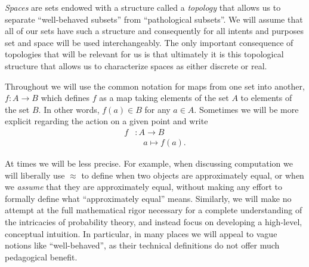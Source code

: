 \emph{Spaces} are sets endowed with a structure called a 
\emph{topology} that allows us to separate ``well-behaved subsets''
from ``pathological subsets''.  We will assume that all of our sets
have such a structure and consequently for all intents and purposes 
set and space will be used interchangeably.  The only important
consequence of topologies that will be relevant for us is that ultimately
it is this topological structure that allows us to characterize spaces as 
either discrete or real.

Throughout we will use the common notation for maps from one set into 
another, $f : A \rightarrow B$ which defines $f$ as a map taking elements 
of the set $A$ to elements of the set $B$. In other words, $f(a) \in B$ for 
any $a \in A$.  Sometimes we will be more explicit regarding the action
on a given point and write
%
\begin{align*}
f &: A \rightarrow B \\
  &\quad a \mapsto f \! \left( a \right).
\end{align*}

At times we will be less precise.  For example, when discussing computation 
we will liberally use $\approx$ to define when two objects are approximately 
equal, or when we \emph{assume} that they are approximately equal, without 
making any effort to formally define what ``approximately equal'' means.
Similarly, we will make no attempt at the full mathematical rigor necessary for 
a complete understanding of the intricacies of probability theory, and instead 
focus on developing a high-level, conceptual intuition.  In particular, in many 
places we will appeal to vague notions like ``well-behaved'', as their technical 
definitions do not offer much pedagogical benefit.


